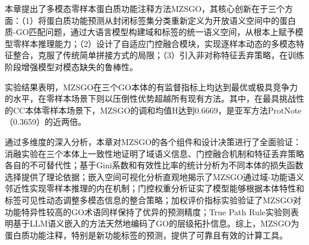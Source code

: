 本章提出了多模态零样本蛋白质功能注释方法MZSGO，其核心创新在于三个方面：（1）将蛋白质功能预测从封闭标签集分类重新定义为开放语义空间中的蛋白质-GO匹配问题，通过大语言模型构建域和标签的统一语义空间，从根本上赋予模型零样本推理能力；（2）设计了自适应门控融合模块，实现逐样本动态的多模态特征整合，克服了传统简单拼接方式的局限；（3）引入非对称特征丢弃策略，在训练阶段增强模型对模态缺失的鲁棒性。

实验结果表明，MZSGO在三个GO本体的有监督指标上均达到最优或极具竞争力的水平，在零样本场景下则以压倒性优势超越所有现有方法。其中，在最具挑战性的CC本体零样本场景下，MZSGO的调和均值H达到0.6669，是亚军方法ProtNote（0.3659）的近两倍。

通过多维度的深入分析，本章对MZSGO的各个组件和设计决策进行了全面验证：消融实验在三个本体上一致性地证明了域语义信息、门控融合机制和特征丢弃策略各自的不可替代性；基于Gini系数和有效性比率的统计分析为不同本体的损失函数选择提供了理论依据；嵌入空间可视化分析直观地揭示了MZSGO通过域-功能语义邻近性实现零样本推理的内在机制；门控权重分析证实了模型能够根据本体特性和标签可见性动态调整多模态信息的整合策略；加权评价指标实验验证了MZSGO对功能特异性较高的GO术语同样保持了优异的预测精度；True Path Rule实验则表明基于LLM语义嵌入的方法天然地编码了GO的层级拓扑信息。综上，MZSGO为蛋白质功能注释，特别是新功能标签的预测，提供了可靠且有效的计算工具。
